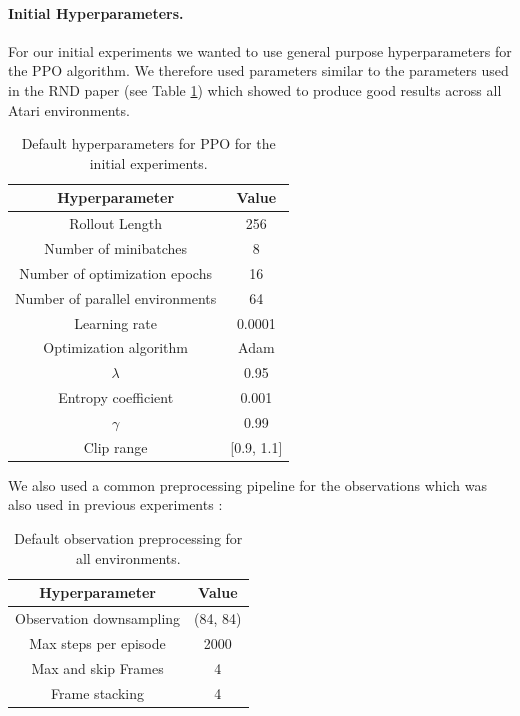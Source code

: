 \paragraph{Initial Hyperparameters.}
For our initial experiments we wanted to use general purpose hyperparameters for the PPO algorithm. We therefore used parameters similar to the parameters used in the RND paper \cite{burda2018exploration} (see Table \ref{tab:PPOHyperparemeters}) which showed to produce good results across all Atari environments. 


\begin{table} [ht]
    \begin{center}
        \begin{tabular}{|c|c|}
            \hline
            Hyperparameter & Value \\
            \hline
            Rollout Length & 256 \\
            Number of minibatches & 8 \\
            Number of optimization epochs & 16 \\
            Number of parallel environments & 64 \\
            Learning rate & 0.0001 \\
            Optimization algorithm & Adam \cite{kingma2014adam} \\
            $\lambda$ & 0.95 \\
            Entropy coefficient & 0.001 \\
            $\gamma$ & 0.99 \\
            Clip range & [0.9, 1.1] \\
            \hline
        \end{tabular}
    \end{center}
    \caption[Default Hyperparameters]{Default hyperparameters for PPO for the initial experiments.} \label{tab:PPOHyperparemeters}
\end{table}

We also used a common preprocessing pipeline for the observations which was also used in previous experiments \cite{huang2019}:

\begin{table} [h]
    \begin{center}
        \begin{tabular}{|c|c|}
            \hline
            Hyperparameter & Value \\
            \hline
            Observation downsampling & (84, 84) \\
            Max steps per episode & 2000 \\
            Max and skip Frames & 4 \\
            Frame stacking & 4 \\
            \hline
        \end{tabular}
    \end{center}
    \caption[Default Observation Preprocessing]{Default observation preprocessing for all environments.} \label{tab:RNDPreprocessing}
\end{table}


